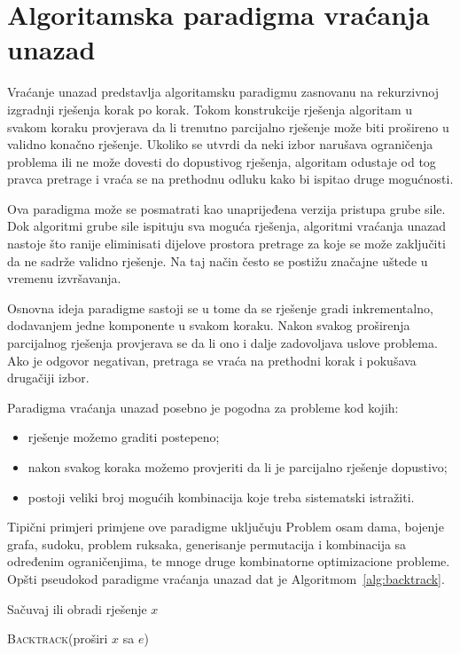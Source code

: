 \section{Algoritamska paradigma vraćanja unazad}

{Vraćanje unazad} predstavlja algoritamsku paradigmu zasnovanu na rekurzivnoj izgradnji rješenja korak po korak. Tokom konstrukcije rješenja algoritam u svakom koraku provjerava da li trenutno parcijalno rješenje može biti prošireno u validno konačno rješenje. Ukoliko se utvrdi da neki izbor narušava ograničenja problema ili ne može dovesti do dopustivog rješenja, algoritam odustaje od tog pravca pretrage i vraća se na prethodnu odluku kako bi ispitao druge mogućnosti.

Ova paradigma može se posmatrati kao unaprijeđena verzija pristupa grube sile. Dok algoritmi grube sile ispituju sva moguća rješenja, algoritmi vraćanja unazad nastoje što ranije eliminisati dijelove prostora pretrage za koje se može zaključiti da ne sadrže validno rješenje. Na taj način često se postižu značajne uštede u vremenu izvršavanja.

Osnovna ideja paradigme sastoji se u tome da se rješenje gradi inkrementalno, dodavanjem jedne komponente u svakom koraku. Nakon svakog proširenja parcijalnog rješenja provjerava se da li ono i dalje zadovoljava uslove problema. Ako je odgovor negativan, pretraga se vraća na prethodni korak i pokušava drugačiji izbor.

Paradigma vraćanja unazad posebno je pogodna za probleme kod kojih:

\begin{itemize}
	\item rješenje možemo graditi postepeno;
	\item nakon svakog koraka možemo provjeriti da li je parcijalno rješenje dopustivo;
	\item postoji veliki broj mogućih kombinacija koje treba sistematski istražiti.
\end{itemize}

Tipični primjeri primjene ove paradigme uključuju Problem osam dama, bojenje grafa, sudoku, problem ruksaka, generisanje permutacija i kombinacija sa određenim ograničenjima, te mnoge druge kombinatorne optimizacione probleme. Opšti pseudokod paradigme vraćanja unazad dat je Algoritmom~\ref{alg:backtrack}.

\begin{algorithm}
	\begin{algorithmic}[1]
		
		\State \Return
		\EndIf
		
		\State Sačuvaj ili obradi rješenje $x$
		\State \Return
		\EndIf
		
		\State \textsc{Backtrack}(proširi $x$ sa $e$)
		\EndFor
		
		\EndProcedure
	\end{algorithmic}
	\caption{Opšti obrazac paradigme vraćanja unazad.}
	\label{alg:backtrack}
\end{algorithm}

